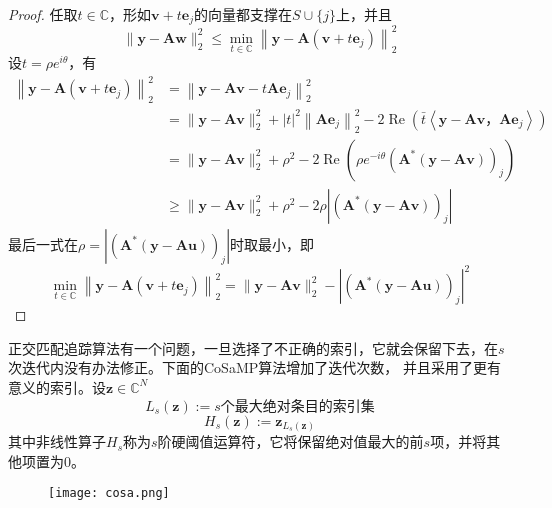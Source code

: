 \begin{proof}
任取$t \in \mathbb{C}$，形如$\mathbf{v}+t \mathbf{e}_j$的向量都支撑在$S \cup\{j\}$上，并且
\begin{equation}
    \|\mathbf{y}-\mathbf{A} \mathbf{w}\|_2^2 \leq \min _{t \in \mathbb{C}}\left\|\mathbf{y}-\mathbf{A}\left(\mathbf{v}+t \mathbf{e}_j\right)\right\|_2^2
\end{equation}
设$t=\rho e^{i \theta}$，有
\begin{equation}
    \begin{aligned}
    \left\|\mathbf{y}-\mathbf{A}\left(\mathbf{v}+t \mathbf{e}_j\right)\right\|_2^2 & =\left\|\mathbf{y}-\mathbf{A v}-t \mathbf{A} \mathbf{e}_j\right\|_2^2 \\
    & =\|\mathbf{y}-\mathbf{A v}\|_2^2+|t|^2\left\|\mathbf{A} \mathbf{e}_j\right\|_2^2-2 \operatorname{Re}\left(\bar{t}\left\langle\mathbf{y}-\mathbf{A v}，\mathbf{A} \mathbf{e}_j\right\rangle\right) \\
    & =\|\mathbf{y}-\mathbf{A v}\|_2^2+\rho^2-2 \operatorname{Re}\left(\rho e^{-i \theta}\left(\mathbf{A}^*(\mathbf{y}-\mathbf{A v})\right)_j\right) \\
    & \geq\|\mathbf{y}-\mathbf{A v}\|_2^2+\rho^2-2 \rho\left|\left(\mathbf{A}^*(\mathbf{y}-\mathbf{A} \mathbf{v})\right)_j\right|
    \end{aligned}
\end{equation}
最后一式在$\rho=\left|\left(\mathbf{A}^*(\mathbf{y}-\mathbf{A} \mathbf{u})\right)_j\right|$时取最小，即
\begin{equation}
    \min _{t \in \mathbb{C}}\left\|\mathbf{y}-\mathbf{A}\left(\mathbf{v}+t \mathbf{e}_j\right)\right\|_2^2=\|\mathbf{y}-\mathbf{A v}\|_2^2-\left|\left(\mathbf{A}^*(\mathbf{y}-\mathbf{A} \mathbf{u})\right)_j\right|^2
\end{equation}
\end{proof}
正交匹配追踪算法有一个问题，一旦选择了不正确的索引，它就会保留下去，在$s$次迭代内没有办法修正。下面的CoSaMP算法增加了迭代次数，
并且采用了更有意义的索引。设$\mathbf{z} \in \mathbb{C}^N$
\begin{equation}
    L_s(\mathbf{z}):=s\text{个最大绝对条目的索引集}
\end{equation}
\begin{equation}
    H_s(\mathbf{z}):=\mathbf{z}_{L_s(\mathbf{z})}
\end{equation}
其中非线性算子$H_s$称为$s$阶硬阈值运算符，它将保留绝对值最大的前$s$项，并将其他项置为0。\par
\begin{figure}[!htbp]
    \centering
    \texttt{[image: cosa.png]}
\end{figure}
